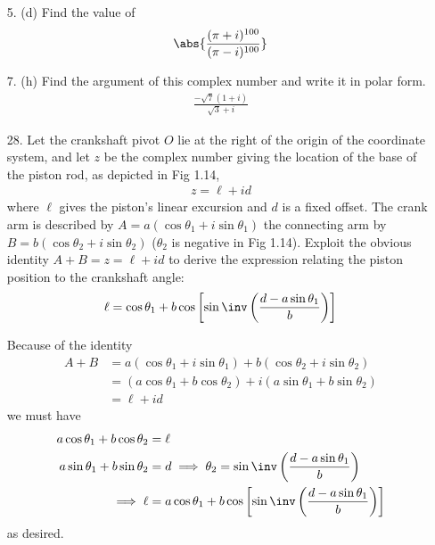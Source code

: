 \documentclass{article}
\begin{document}
\begin{itemize}
	\item[5.] (d) Find the value of
		\begin{align*}
			\abs{\frac{(\pi+i)^{100}}{(\pi-i)^{100}}}
		\end{align*}

	\item[7.] (h) Find the argument of this complex number and write it in polar form. 
		\begin{align*}
			\frac{-\sqrt{7}(1+i)}{\sqrt{3}+i}
		\end{align*}

	\item[28.] Let the crankshaft pivot $O$ lie at the right of the origin of the coordinate system, and let $z$ be the complex number giving the location of the base of the piston rod, as depicted in Fig 1.14,
		\begin{align*}
			z=\ell+id
		\end{align*}
		where $\ell$ gives the piston's linear excursion and $d$ is a fixed offset. The crank arm is described by $A=a(\cos \theta_1+i\sin\theta_1)$ the connecting arm by $B=b(\cos\theta_2+i\sin\theta_2)$ ($\theta_2$ is negative in Fig 1.14). Exploit the obvious identity $A+B=z=\ell+id$ to derive the expression relating the piston position to the crankshaft angle:
		\begin{align*}
			\ell=\cos\theta_1+b\cos\left[ \sin\inv\left( \frac{d-a\sin\theta_1}{b} \right) \right]
		\end{align*}
		\begin{soln}
			Because of the identity
			\begin{align*}
				A+B &= a(\cos\theta_1+i\sin\theta_1)+b(\cos\theta_2+i\sin\theta_2) \\
				&= (a\cos \theta_1+b\cos\theta_2) + i(a\sin\theta_1+b\sin\theta_2) \\
				&= \ell+id
			\end{align*}
			we must have 
			\begin{align*}
				a\cos\theta_1+b\cos\theta_2 &= \ell \\
				a\sin\theta_1+b\sin\theta_2 &= d \implies \theta_2 = \sin\inv\left( \frac{d-a\sin\theta_1}{b} \right) \\
				\implies \ell &= a\cos \theta_1 + b\cos\left[ \sin\inv\left( \frac{d-a\sin\theta_1}{b} \right) \right]
			\end{align*}
			as desired.
		\end{soln}
		
\end{itemize}
\end{document}

